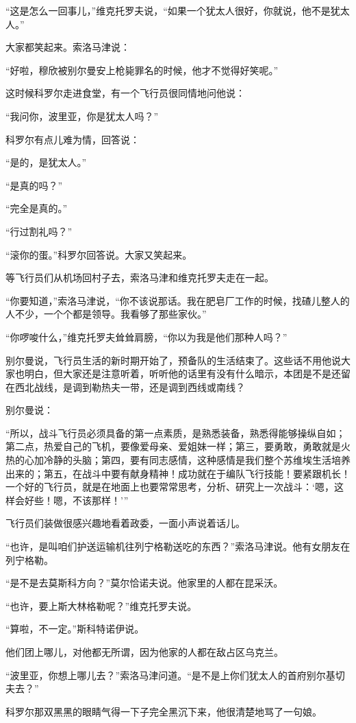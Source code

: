 “这是怎么一回事儿，”维克托罗夫说，“如果一个犹太人很好，你就说，他不是犹太人。”

大家都笑起来。索洛马津说：

“好啦，穆欣被别尔曼安上枪毙罪名的时候，他才不觉得好笑呢。”

这时候科罗尔走进食堂，有一个飞行员很同情地问他说：

“我问你，波里亚，你是犹太人吗？”

科罗尔有点儿难为情，回答说：

“是的，是犹太人。”

“是真的吗？”

“完全是真的。”

“行过割礼吗？”

“滚你的蛋。”科罗尔回答说。大家又笑起来。

等飞行员们从机场回村子去，索洛马津和维克托罗夫走在一起。

“你要知道，”索洛马津说，“你不该说那话。我在肥皂厂工作的时候，找碴儿整人的人不少，一个个都是领导。我看够了那些家伙。”

“你啰唆什么，”维克托罗夫耸耸肩膀，“你以为我是他们那种人吗？”

别尔曼说，飞行员生活的新时期开始了，预备队的生活结束了。这些话不用他说大家也明白，但大家还是注意听着，听听他的话里有没有什么暗示，本团是不是还留在西北战线，是调到勒热夫一带，还是调到西线或南线？

别尔曼说：

“所以，战斗飞行员必须具备的第一点素质，是熟悉装备，熟悉得能够操纵自如；第二点，热爱自己的飞机，要像爱母亲、爱姐妹一样；第三，要勇敢，勇敢就是火热的心加冷静的头脑；第四，要有同志感情，这种感情是我们整个苏维埃生活培养出来的；第五，在战斗中要有献身精神！成功就在于编队飞行技能！要紧跟机长！一个好的飞行员，就是在地面上也要常常思考，分析、研究上一次战斗：‘嗯，这样会好些！嗯，不该那样！’”

飞行员们装做很感兴趣地看着政委，一面小声说着话儿。

“也许，是叫咱们护送运输机往列宁格勒送吃的东西？”索洛马津说。他有女朋友在列宁格勒。

“是不是去莫斯科方向？”莫尔恰诺夫说。他家里的人都在昆采沃。

“也许，要上斯大林格勒呢？”维克托罗夫说。

“算啦，不一定。”斯科特诺伊说。

他们团上哪儿，对他都无所谓，因为他家的人都在敌占区乌克兰。

“波里亚，你想上哪儿去？”索洛马津问道。“是不是上你们犹太人的首府别尔基切夫去？”

科罗尔那双黑黑的眼睛气得一下子完全黑沉下来，他很清楚地骂了一句娘。

